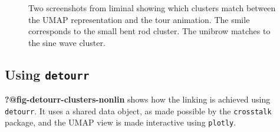 \documentclass[
  letterpaper,
]{book}
\begin{document}
\begin{figure}

{\centering 

}

\caption{\label{fig-liminal-clusters-nonlin}Two screenshots from liminal
showing which clusters match between the UMAP representation and the
tour animation. The smile corresponds to the small bent rod cluster. The
unibrow matches to the sine wave cluster.}

\end{figure}

\hypertarget{using-detourr}{%
\subsection{\texorpdfstring{Using
\texttt{detourr}}{Using detourr}}\label{using-detourr}}

\textbf{?@fig-detourr-clusters-nonlin} shows how the linking is achieved
using \texttt{detourr}. It uses a shared data object, as made possible
by the \texttt{crosstalk} package, and the UMAP view is made interactive
using \texttt{plotly}.
\end{document}
